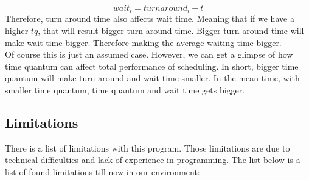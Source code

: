 \documentclass{homework}
\begin{document}
\[
    wait_i = turnaround_i - t
\]
Therefore, turn around time also affects wait time. Meaning that if we have a higher $tq$, that will result bigger turn around time. Bigger turn around time will make wait time bigger. Therefore making the average waiting time bigger.
\\
Of course this is just an assumed case. However, we can get a glimpse of how time quantum can affect total performance of scheduling. In short, bigger time quantum will make turn around and wait time smaller. In the mean time, with smaller time quantum, time quantum and wait time gets bigger.

\pagebreak

\subsection{Limitations}
There is a list of limitations with this program. Those limitations are due to technical difficulties and lack of experience in programming. The list below is a list of found limitations till now in our environment:
\end{document}
